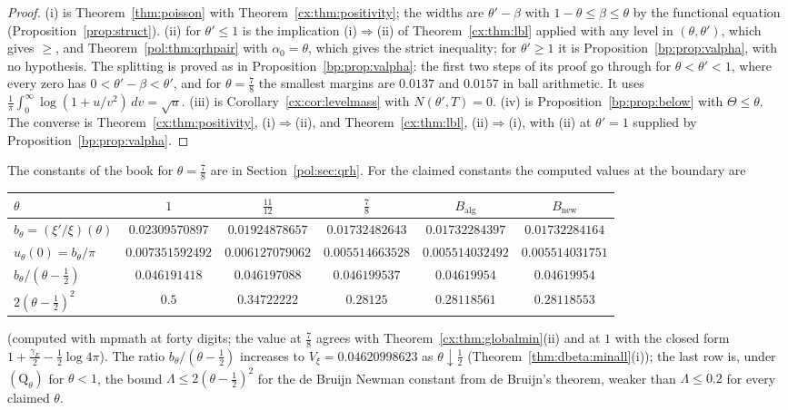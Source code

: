 \begin{proof}
(i) is Theorem~\ref{thm:poisson} with Theorem~\ref{cx:thm:positivity}; the widths are $\theta'-\beta$ with $1-\theta\le\beta\le\theta$ by the functional equation (Proposition~\ref{prop:struct}). (ii) for $\theta'\le1$ is the implication (i)$\Rightarrow$(ii) of Theorem~\ref{cx:thm:lbl} applied with any level in $(\theta,\theta')$, which gives $\ge$, and Theorem~\ref{pol:thm:qrhpair} with $\alpha_0=\theta$, which gives the strict inequality; for $\theta'\ge1$ it is Proposition~\ref{bp:prop:valpha}, with no hypothesis. The splitting is proved as in Proposition~\ref{bp:prop:valpha}: the first two steps of its proof go through for $\theta<\theta'<1$, where every zero has $0<\theta'-\beta<\theta'$, and for $\theta=\frac78$ the smallest margins are $0.0137$ and $0.0157$ in ball arithmetic. It uses $\frac1\pi\int_0^\infty\log(1+u/v^2)\,dv=\sqrt u$. (iii) is Corollary~\ref{cx:cor:levelmass} with $N(\theta',T)=0$. (iv) is Proposition~\ref{bp:prop:below} with $\Theta\le\theta$. The converse is Theorem~\ref{cx:thm:positivity}, (i)$\Rightarrow$(ii), and Theorem~\ref{cx:thm:lbl}, (ii)$\Rightarrow$(i), with (ii) at $\theta'=1$ supplied by Proposition~\ref{bp:prop:valpha}.
\end{proof}

The constants of the book for $\theta=\frac78$ are in Section~\ref{pol:sec:qrh}. For the claimed constants the computed values at the boundary are
\begin{center}\scriptsize\setlength{\tabcolsep}{2pt}
\begin{tabular}{lccccc}
\toprule
$\theta$ & $1$ & $\frac{11}{12}$ & $\frac78$ & $B_{\mathrm{alg}}$ & $B_{\mathrm{new}}$\\
\midrule
$b_\theta=(\xi'/\xi)(\theta)$ & $0.02309570897$ & $0.01924878657$ & $0.01732482643$ & $0.01732284397$ & $0.01732284164$\\
$u_\theta(0)=b_\theta/\pi$ & $0.007351592492$ & $0.006127079062$ & $0.005514663528$ & $0.005514032492$ & $0.005514031751$\\
$b_\theta/(\theta-\frac12)$ & $0.046191418$ & $0.046197088$ & $0.046199537$ & $0.04619954$ & $0.04619954$\\
$2(\theta-\frac12)^2$ & $0.5$ & $0.34722222$ & $0.28125$ & $0.28118561$ & $0.28118553$\\
\bottomrule
\end{tabular}
\end{center}
(computed with mpmath at forty digits; the value at $\frac78$ agrees with Theorem~\ref{cx:thm:globalmin}(ii) and at $1$ with the closed form $1+\frac{\gamma_E}2-\frac12\log4\pi$). The ratio $b_\theta/(\theta-\frac12)$ increases to $V_\xi=0.04620998623$ as $\theta\downarrow\frac12$ (Theorem~\ref{thm:dbeta:minall}(i)); the last row is, under $(\mathrm Q_\theta)$ for $\theta<1$, the bound $\Lambda\le2(\theta-\frac12)^2$ for the de Bruijn Newman constant from de Bruijn's theorem, weaker than $\Lambda\le0.2$ \cite{PT21} for every claimed $\theta$.

